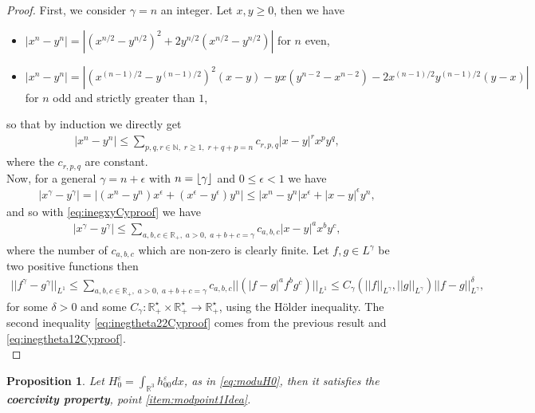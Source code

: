 \documentclass[a4paper, 15pt]{article}
\DeclarePairedDelimiter\floor{\lfloor}{\rfloor}
\numberwithin{equation}{section}
\newtheorem{propal}[defi]{Proposition}
\begin{document}
\begin{proof}
First, we consider $\gamma=n$ an integer. Let $x,y\geq0$, then we have
\begin{itemize}
\item $|x^n-y^n|=|(x^{n/2}-y^{n/2})^2+2y^{n/2}(x^{n/2}-y^{n/2})|$ for $n$ even,
\item $|x^n-y^n|=|(x^{(n-1)/2}-y^{(n-1)/2})^2(x-y)-yx(y^{n-2}-x^{n-2})-2x^{(n-1)/2}y^{(n-1)/2}(y-x)|$ for $n$ odd and strictly greater than $1$,
\end{itemize}
so that by induction we directly get 
\begin{align}
\label{eq:inegxyCyproof}
|x^n-y^n|\leq \sum_{p,q,r\in\mathbb{N},\;r\geq1,\;r+q+p=n}c_{r,p,q}|x-y|^rx^py^q,
\end{align}
where the $c_{r,p,q}$ are constant.\\
Now, for a general $\gamma=n+\epsilon$ with $n=\floor{\gamma}{}$ and $0\leq\epsilon<1$ we have 
\begin{align*}
    |x^\gamma-y^\gamma|=|(x^n-y^n)x^\epsilon+(x^\epsilon-y^\epsilon)y^n|\leq |x^n-y^n|x^\epsilon+|x-y|^\epsilon y^n,
\end{align*}
and so with \eqref{eq:inegxyCyproof} we have 
\begin{align*}
    |x^\gamma-y^\gamma|\leq \sum_{a,b,c\in\mathbb{R}_+,\;a>0,\;a+b+c=\gamma}c_{a,b,c}|x-y|^ax^by^c,
\end{align*}
where the number of $c_{a,b,c}$ which are non-zero is clearly finite. Let $f,g\in L^\gamma$ be two positive functions then
\begin{align*}
    ||f^\gamma-g^\gamma||_{L^1}\leq \sum_{a,b,c\in\mathbb{R}_+,\;a>0,\;a+b+c=\gamma}c_{a,b,c}||(|f-g|^af^bg^c)||_{L^1}\leq C_\gamma(||f||_{L^{\gamma}},||g||_{L^{\gamma}})||f-g||^\delta_{L^\gamma},
\end{align*}
for some $\delta>0$ and some $C_\gamma:\mathbb{R}^\star_+\times\mathbb{R}^\star_+\to\mathbb{R}^\star_+$, using the Hölder inequality. The second inequality \eqref{eq:inegtheta22Cyproof} comes from the previous result and \eqref{eq:inegtheta12Cyproof}.\\
\end{proof}
\begin{propal}
\label{propal:tryoneh00Cyproof}
    Let $H^\varepsilon_0=\int_{\mathbb{R}^3}{h_{00}^\varepsilon dx}$, as in \eqref{eq:moduH0}, then it satisfies the \textbf{coercivity property}, point \ref{item:modpoint1Idea}.
\end{propal}
\end{document}
